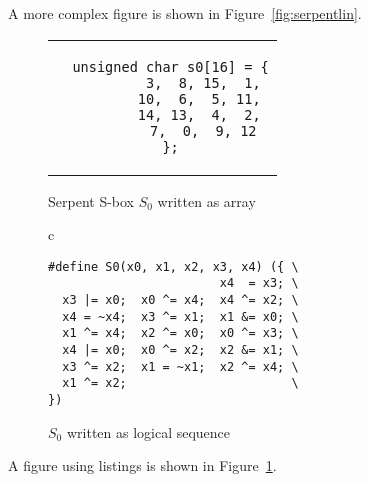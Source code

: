 A more complex figure is shown in Figure~\ref{fig:serpentlin}. \blindtext





\begin{figure}
\centering
\begin{minipage}[b]{0.45\textwidth}
\centering
\begin{tabular}{c}
\begin{lstlisting}
  unsigned char s0[16] = {
          3,  8, 15,  1,
         10,  6,  5, 11,
         14, 13,  4,  2,
          7,  0,  9, 12
  };
\end{lstlisting}
\end{tabular}
\caption{Serpent S-box $S_0$ written as array}
\label{fig:serpents0a}
\end{minipage}
\hspace{0.25cm}
\vline
\hspace{0.25cm}
\begin{minipage}[b]{0.45\textwidth}
\centering
\begin{tabular}{c}
\begin{lstlisting}
#define S0(x0, x1, x2, x3, x4) ({ \
                        x4  = x3; \
  x3 |= x0;  x0 ^= x4;  x4 ^= x2; \
  x4 = ~x4;  x3 ^= x1;  x1 &= x0; \
  x1 ^= x4;  x2 ^= x0;  x0 ^= x3; \
  x4 |= x0;  x0 ^= x2;  x2 &= x1; \
  x3 ^= x2;  x1 = ~x1;  x2 ^= x4; \
  x1 ^= x2;                       \
})
\end{lstlisting}
\end{tabular}
\caption{$S_0$ written as logical sequence}
\label{fig:serpents0l}
\end{minipage}
\end{figure}


A figure using listings is shown in Figure~\ref{fig:serpents0l}. \blindtext

